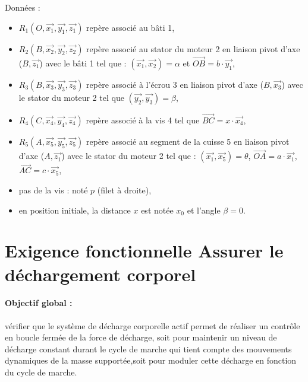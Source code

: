 Données :
\begin{itemize}
 \item $R_1(O,\vec{x_1},\vec{y_1},\vec{z_1})$ repère associé au bâti 1,
 \item $R_2(B,\vec{x_2},\vec{y_2},\vec{z_2})$ repère associé au stator du moteur 2 en liaison pivot d'axe ($B,\vec{z_1}$) avec le bâti 1 tel que : $(\vec{x_1},\vec{x_2})=\alpha$ et $\overrightarrow{OB}=b\cdot\vec{y_1}$,
 \item $R_3(B,\vec{x_3},\vec{y_3},\vec{z_3})$ repère associé à l'écrou 3 en liaison pivot d'axe ($B,\vec{x_3}$) avec le stator du moteur 2 tel que $(\vec{y_2},\vec{y_3})=\beta$,
 \item $R_4(C,\vec{x_4},\vec{y_4},\vec{z_4})$ repère associé à la vis 4 tel que
$\overrightarrow{BC}=x\cdot \vec{x_4}$,
 \item $R_5(A,\vec{x_5},\vec{y_5},\vec{z_5})$ repère associé au segment de la cuisse 5 en liaison pivot d'axe ($A,\vec{z_1}$) avec le stator du moteur 2 tel que : $\left(\vec{x_1},\vec{x_5}\right)=\theta$, $\overrightarrow{OA}=a\cdot\vec{x_1}$,$\overrightarrow{AC}=c\cdot \vec{x_5}$,
 \item pas de la vis : noté $p$ (filet à droite),
 \item en position initiale, la distance $x$ est notée $x_0$ et l'angle $\beta=0$.
\end{itemize}
 


\section{Exigence fonctionnelle \og Assurer le déchargement corporel \fg}

\paragraph{Objectif global :} vérifier que le système de décharge corporelle actif permet de réaliser un contrôle en boucle fermée de la force de décharge, soit pour maintenir un niveau de décharge constant durant le cycle de marche qui tient compte des mouvements dynamiques de la masse supportée,soit pour moduler cette décharge en fonction du cycle de marche.

